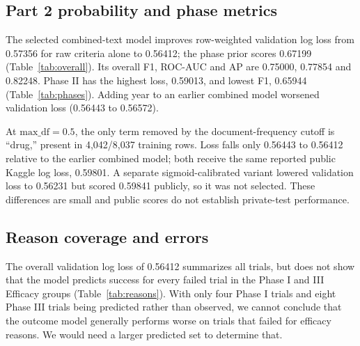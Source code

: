 \documentclass[10pt,twocolumn,letterpaper]{article}
\begin{document}
\subsection{Part 2 probability and phase metrics}
The selected combined-text model improves row-weighted validation log loss
from 0.57356 for raw criteria alone to 0.56412; the phase prior scores
0.67199 (Table~\ref{tab:overall}). Its overall F1, ROC-AUC and AP are
0.75000, 0.77854 and 0.82248. Phase II has the highest loss, 0.59013, and
lowest F1, 0.65944 (Table~\ref{tab:phases}). Adding year to an earlier combined
model worsened validation loss (0.56443 to 0.56572).

At $\mathrm{max\_df}=0.5$, the only term removed by the document-frequency
cutoff is ``drug,'' present in 4,042/8,037 training rows. Loss falls only
0.56443 to 0.56412 relative to the earlier combined model; both receive
the same reported public Kaggle log loss, 0.59801. A separate sigmoid-calibrated
variant lowered validation loss to 0.56231 but scored 0.59841 publicly, so it
was not selected. These differences are small and public scores do not establish
private-test performance.
\begin{table}[t]
\centering\small\setlength{\tabcolsep}{3pt}
\caption{Part 2 overall validation metrics; lower log loss is better. ROC denotes
ROC-AUC; AP is average precision.}
\label{tab:overall}
\end{table}
\begin{table}[t]
\centering\small\setlength{\tabcolsep}{3pt}
\caption{Selected uncalibrated model by phase on validation; F1 uses 0.5.}
\label{tab:phases}
\end{table}

\subsection{Reason coverage and errors}
\begin{table}[t]
\centering\small\setlength{\tabcolsep}{3pt}
\caption{Selected model's validation false successes among failed trials.
T/P: observed/predicted reason counts. No record means no Part 1 match;
groups overlap, and -- denotes an empty group.}
\label{tab:reasons}
\end{table}
The overall validation log loss of 0.56412 summarizes all trials, but does not show that
the model predicts success for every failed trial in the Phase I and III
Efficacy groups (Table~\ref{tab:reasons}). With only four Phase I trials and
eight Phase III trials being predicted rather than observed, we cannot conclude that the
outcome model generally performs worse on trials that failed for efficacy reasons.
We would need a larger predicted set to determine that.
\end{document}
